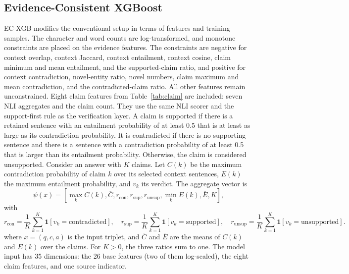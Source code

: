 \documentclass[a4paper,fleqn]{cas-sc}
\begin{document}
\subsection{Evidence-Consistent XGBoost}

EC-XGB modifies the conventional setup in terms of features and training samples. The character and word counts are log-transformed, and monotone constraints are placed on the evidence features. The constraints are negative for context overlap, context Jaccard, context entailment, context cosine, claim minimum and mean entailment, and the supported-claim ratio, and positive for context contradiction, novel-entity ratio, novel numbers, claim maximum and mean contradiction, and the contradicted-claim ratio. All other features remain unconstrained. Eight claim features from Table~\ref{tab:claim} are included: seven NLI aggregates and the claim count. They use the same NLI scorer and the support-first rule as the verification layer. A claim is supported if there is a retained sentence with an entailment probability of at least 0.5 that is at least as large as its contradiction probability. It is contradicted if there is no supporting sentence and there is a sentence with a contradiction probability of at least 0.5 that is larger than its entailment probability. Otherwise, the claim is considered unsupported. Consider an answer with $K$ claims. Let $C(k)$ be the maximum contradiction probability of claim $k$ over its selected context sentences, $E(k)$ the maximum entailment probability, and $v_k$ its verdict. The aggregate vector is
\begin{equation}
  \psi(x) = [\max_k C(k), \overline{C}, r_{\text{con}}, r_{\text{sup}}, r_{\text{unsup}}, \min_k E(k), \overline{E}, K],
\end{equation}
with
\begin{equation}
  r_{\text{con}} = \frac{1}{K}\sum_{k=1}^{K} \mathbf{1}[v_k = \text{contradicted}], \quad
  r_{\text{sup}} = \frac{1}{K}\sum_{k=1}^{K} \mathbf{1}[v_k = \text{supported}], \quad
  r_{\text{unsup}} = \frac{1}{K}\sum_{k=1}^{K} \mathbf{1}[v_k = \text{unsupported}].
\end{equation}
where $x=(q,c,a)$ is the input triplet, and $\overline{C}$ and $\overline{E}$ are the means of $C(k)$ and $E(k)$ over the claims. For $K>0$, the three ratios sum to one. The model input has 35 dimensions: the 26 base features (two of them log-scaled), the eight claim features, and one source indicator.
\end{document}
